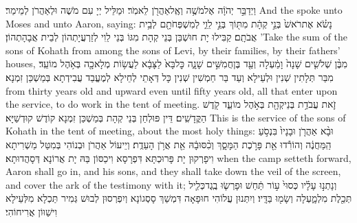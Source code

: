\newperek
{}%
{וַיְדַבֵּ֣ר יְהֹוָ֔ה אֶל\maqqaf מֹשֶׁ֥ה וְאֶֽל\maqqaf אַהֲרֹ֖ן לֵאמֹֽר׃}
{וּמַלֵּיל יְיָ עִם מֹשֶׁה וּלְאַהֲרֹן לְמֵימַר׃}
{And the \lord\space spoke unto Moses and unto Aaron, saying:}{}
{נָשֹׂ֗א אֶת\maqqaf רֹאשׁ֙ בְּנֵ֣י קְהָ֔ת מִתּ֖וֹךְ בְּנֵ֣י לֵוִ֑י לְמִשְׁפְּחֹתָ֖ם לְבֵ֥ית אֲבֹתָֽם׃}
{קַבִּילוּ יָת חוּשְׁבַּן בְּנֵי קְהָת מִגּוֹ בְּנֵי לֵוִי לְזַרְעֲיָתְהוֹן לְבֵית אֲבָהָתְהוֹן׃}
{’Take the sum of the sons of Kohath from among the sons of Levi, by their families, by their fathers’ houses,}{}
{מִבֶּ֨ן שְׁלֹשִׁ֤ים שָׁנָה֙ וָמַ֔עְלָה וְעַ֖ד בֶּן\maqqaf חֲמִשִּׁ֣ים שָׁנָ֑ה כׇּל\maqqaf בָּא֙ לַצָּבָ֔א לַעֲשׂ֥וֹת מְלָאכָ֖ה בְּאֹ֥הֶל מוֹעֵֽד׃}
{מִבַּר תְּלָתִין שְׁנִין וּלְעֵילָא וְעַד בַּר חַמְשִׁין שְׁנִין כָּל דְּאָתֵי לְחֵילָא לְמֶעֱבַד עֲבִידְתָא בְּמַשְׁכַּן זִמְנָא׃}
{from thirty years old and upward even until fifty years old, all that enter upon the service, to do work in the tent of meeting.}{}
{זֹ֛את עֲבֹדַ֥ת בְּנֵי\maqqaf קְהָ֖ת בְּאֹ֣הֶל מוֹעֵ֑ד קֹ֖דֶשׁ הַקֳּדָשִֽׁים׃}
{דֵּין פּוּלְחַן בְּנֵי קְהָת בְּמַשְׁכַּן זִמְנָא קוֹדֶשׁ קוּדְשַׁיָּא׃}
{This is the service of the sons of Kohath in the tent of meeting, about the most holy things:}{}
{וּבָ֨א אַהֲרֹ֤ן וּבָנָיו֙ בִּנְסֹ֣עַ הַֽמַּחֲנֶ֔ה וְהוֹרִ֕דוּ אֵ֖ת פָּרֹ֣כֶת הַמָּסָ֑ךְ וְכִ֨סּוּ\maqqaf בָ֔הּ אֵ֖ת אֲרֹ֥ן הָעֵדֻֽת׃}
{וְיֵיעוֹל אַהֲרֹן וּבְנוֹהִי בְּמִטַּל מַשְׁרִיתָא וִיפָרְקוּן יָת פָּרוּכְתָּא דִּפְרָסָא וִיכַסּוֹן בַּהּ יָת אֲרוֹנָא דְּסָהֲדוּתָא׃}
{when the camp setteth forward, Aaron shall go in, and his sons, and they shall take down the veil of the screen, and cover the ark of the testimony with it;}{}
{וְנָתְנ֣וּ עָלָ֗יו כְּסוּי֙ ע֣וֹר תַּ֔חַשׁ וּפָרְשׂ֧וּ בֶֽגֶד\maqqaf כְּלִ֛יל תְּכֵ֖לֶת מִלְמָ֑עְלָה וְשָׂמ֖וּ בַּדָּֽיו׃}
{וְיִתְּנוּן עֲלוֹהִי חוּפָאָה דִּמְשַׁךְ סָסְגוֹנָא וְיִפְרְסוּן לְבוּשׁ גְּמִיר תַּכְלָא מִלְּעֵילָא וִישַׁוּוֹן אֲרִיחוֹהִי׃}
